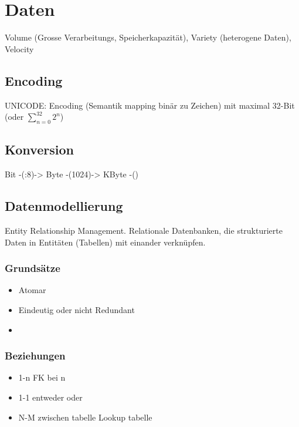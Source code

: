 
\section{Daten}

\begin{definition}
     Volume (Grosse Verarbeitungs, Speicherkapazität), Variety (heterogene Daten), Velocity 
\end{definition}

\subsection{Encoding}

UNICODE: Encoding (Semantik mapping binär zu Zeichen) mit maximal 32-Bit (oder $\sum_{n=0}^{32}2^n$)

\subsection{Konversion}

Bit -(:8)-> Byte -(1024)-> KByte -()


\subsection{Datenmodellierung}

\begin{definition}
    [ERM] Entity Relationship Management. Relationale Datenbanken, die strukturierte Daten in Entitäten (Tabellen) mit einander verknüpfen.
\end{definition}

\subsubsection{Grundsätze}
\begin{itemize}
    \item Atomar
    \item Eindeutig oder nicht Redundant
    \item 
\end{itemize}
\subsubsection{Beziehungen}

\begin{itemize}
    \item 1-n
    \subitem FK bei n
    \item 1-1
    \subitem entweder oder
    \item N-M 
    \subitem zwischen tabelle Lookup tabelle   
\end{itemize}

